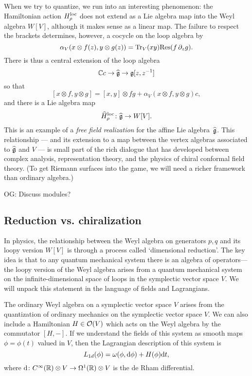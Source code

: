 \documentclass[11pt]{amsart}
\def\owen#1{{\textcolor{violet!65!black}{OG: {#1}}}}
\begin{document}
When we try to quantize, we run into an interesting phenomenon:
the Hamiltonian action $H_\rho^{\rm loc}$ does not extend as a Lie algebra map into the Weyl algebra $W[V]$,
although it makes sense as a linear map.
The failure to respect the brackets determines, however, a cocycle on the loop algebra
by
\[
\alpha_V( x \otimes f(z) , y \otimes g(z)) = {\rm Tr}_V(xy) {\rm Res}(f \, \partial_z g).
\]
There is thus a central extension of the loop algebra 
\[
\mathbb C c \to \widehat{\mathfrak g} \to \mathfrak g[z,z^{-1}]
\]
so that 
\[
[x \otimes f, y \otimes g] = [x,y] \otimes fg + \alpha_V( x \otimes f , y \otimes g) c,
\]
and there is a Lie algebra map
\[
\widehat{H}^{\rm loc}_\rho \colon \widehat{\mathfrak g} \to W[V] .
\]
This is an example of a {\em free field realization} for the affine Lie algebra~$\widehat{\mathfrak g}$.
This relationship --- and its extension to a map between the vertex algebras associated to $\widehat{\mathfrak g}$ and $V$ --- is small part of the rich dialogue that has developed between complex analysis, representation theory, and the physics of chiral conformal field theory.
(To get Riemann surfaces into the game, we will need a richer framework than ordinary algebra.)

\owen{Discuss modules?}

\subsection{Reduction vs. chiralization}

In physics, the relationship between the Weyl algebra on generators $p,q$ and its loopy version $W[V]$ is through a process called `dimensional reduction'.
The key idea is that to any quantum mechanical system there is an algebra of operators---the loopy version of the Weyl algebra arises from a quantum mechanical system on the infinite-dimensional space of loops in the symplectic vector space $V$. 
We will unpack this statement in the language of fields and Lagrangians.

The ordinary Weyl algebra on a symplectic vector space $V$ arises from the quantization of ordinary mechanics on the symplectic vector space $V$.
We can also include a Hamiltonian $H \in \mathcal O(V)$ which acts on the Weyl algebra by the commutator $[H,-]$.
If we understand the fields of this system as smooth maps $\phi = \phi(t)$ valued in $V$, then the Lagrangian description of this system is 
\[
L_{1d} (\phi) = \omega(\phi , {\rm d} \phi) + H(\phi) {\rm d} t ,
\]
where ${\rm d} \colon C^\infty(\mathbb R) \otimes V \to \Omega^1(\mathbb R) \otimes V$ is the de Rham differential. 
\end{document}
